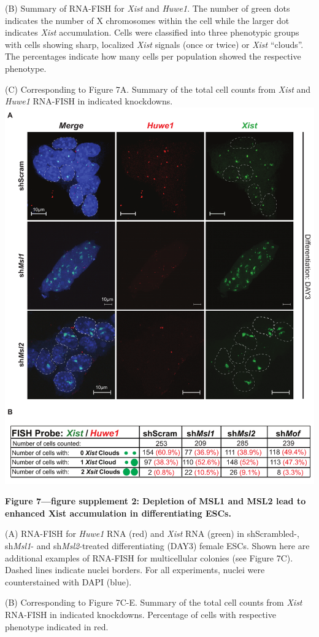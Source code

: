 \begin{footnotesize}
\begin{sffamily}
\begin{singlespacing}
(B) Summary of RNA-FISH for \textit{Xist} and \textit{Huwe1}. The number of green dots indicates the number of X chromosomes within the cell while the larger dot indicates \textit{Xist} accumulation. Cells were classified into three phenotypic groups with cells showing sharp, localized \textit{Xist} signals (once or twice) or \textit{Xist} ``clouds''. The percentages indicate how many cells per population showed the respective phenotype.

(C) Corresponding to Figure 7A. Summary of the total cell counts from \textit{Xist} and \textit{Huwe1} RNA-FISH in indicated knockdowns.
\newpage
\includegraphics[width=\textwidth]{Figures/Appendix/Figure7_supplemental_figure2_scissored.pdf}

\textbf{Figure 7—figure supplement 2: Depletion of MSL1 and MSL2 lead to enhanced Xist accumulation in differentiating ESCs.}

(A) RNA-FISH for \textit{Huwe1} RNA (red) and \textit{Xist} RNA (green) in shScrambled-, sh\textit{Msl1}- and sh\textit{Msl2}-treated differentiating (DAY3) female ESCs. Shown here are additional examples of RNA-FISH for multicellular colonies (see Figure 7C). Dashed lines indicate nuclei borders. For all experiments, nuclei were coun\-ter\-stained with DAPI (blue).

(B) Corresponding to Figure 7C-E. Summary of the total cell counts from \textit{Xist} RNA-FISH in indicated knockdowns. Percentage of cells with respective phenotype indicated in red.

\end{singlespacing}
\end{sffamily}
\end{footnotesize}
